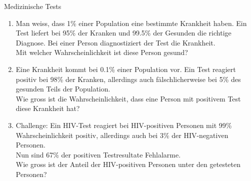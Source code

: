\clearpage
\begin{ueb}
  {Medizinische Tests}{}
  \begin{enumerate}


    \item Man weiss, dass 1\% einer Population eine bestimmte Krankheit haben. Ein Test liefert bei 95\% der Kranken und 99.5\% der Gesunden die richtige Diagnose. Bei einer Person diagnostiziert der Test die Krankheit.\\
          Mit welcher Wahrscheinlichkeit ist diese Person gesund?

    \item Eine Krankheit kommt bei 0.1\% einer Population vor. Ein Test reagiert positiv bei 98\% der Kranken, allerdings auch fälschlicherweise bei 5\% des gesunden Teils der Population.\\
          Wie gross ist die Wahrscheinlichkeit, dass eine Person mit positivem Test diese Krankheit hat?



    \item Challenge: Ein HIV-Test reagiert bei HIV-positiven Personen mit 99\% Wahrscheinlichkeit positiv, allerdings auch bei 3\% der HIV-negativen Personen.\\
          Nun sind 67\% der positiven Testresultate Fehlalarme.\\
          Wie gross ist der Anteil der HIV-positiven Personen unter den getesteten Personen?
          \setcounter{tempCounter}{\value{enumi}}
  \end{enumerate}

\end{ueb}







